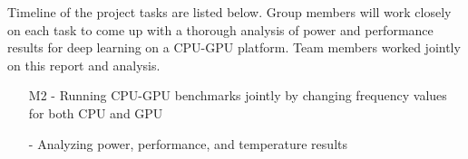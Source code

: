 Timeline of the project tasks are listed below. Group members will work closely on each task to come up with a thorough analysis of power and performance results for deep learning on a CPU-GPU platform. Team members worked jointly on this report and analysis.  

\begin{itemize}
\item[M2 -] Running CPU-GPU benchmarks jointly by changing frequency values for both CPU and GPU
\item[-] Analyzing power, performance, and temperature results 
\end{itemize}
